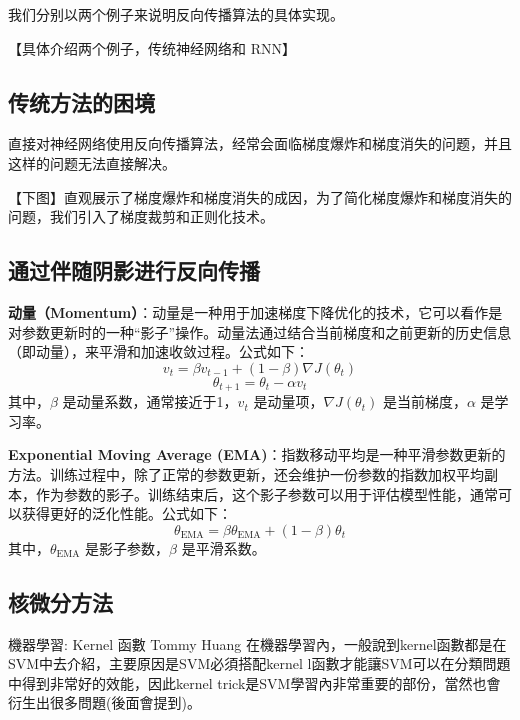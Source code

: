 \documentclass[12pt,a4paper]{amsart}
\begin{document}
我们分别以两个例子来说明反向传播算法的具体实现。

【具体介绍两个例子，传统神经网络和 RNN】

\subsection{传统方法的困境}

直接对神经网络使用反向传播算法，经常会面临梯度爆炸和梯度消失的问题，并且这样的问题无法直接解决。

【下图】直观展示了梯度爆炸和梯度消失的成因，为了简化梯度爆炸和梯度消失的问题，我们引入了梯度裁剪和正则化技术。

\subsection{通过伴随阴影进行反向传播}

\textbf{动量（Momentum）}：动量是一种用于加速梯度下降优化的技术，它可以看作是对参数更新时的一种“影子”操作。动量法通过结合当前梯度和之前更新的历史信息（即动量），来平滑和加速收敛过程。公式如下：
\begin{equation}
v_t = \beta v_{t-1} + (1 - \beta) \nabla J(\theta_t)
\end{equation}
\begin{equation}
\theta_{t+1} = \theta_t - \alpha v_t
\end{equation}
其中，$\beta$ 是动量系数，通常接近于1，$v_t$ 是动量项，$\nabla J(\theta_t)$ 是当前梯度，$\alpha$ 是学习率。

\textbf{Exponential Moving Average (EMA)}：指数移动平均是一种平滑参数更新的方法。训练过程中，除了正常的参数更新，还会维护一份参数的指数加权平均副本，作为参数的影子。训练结束后，这个影子参数可以用于评估模型性能，通常可以获得更好的泛化性能。公式如下：
\begin{equation}
\theta_{\text{EMA}} = \beta \theta_{\text{EMA}} + (1 - \beta) \theta_t
\end{equation}
其中，$\theta_{\text{EMA}}$ 是影子参数，$\beta$ 是平滑系数。

\subsection{核微分方法}

機器學習: Kernel 函數
Tommy Huang
在機器學習內，一般說到kernel函數都是在SVM中去介紹，主要原因是SVM必須搭配kernel l函數才能讓SVM可以在分類問題中得到非常好的效能，因此kernel trick是SVM學習內非常重要的部份，當然也會衍生出很多問題(後面會提到)。
\end{document}

